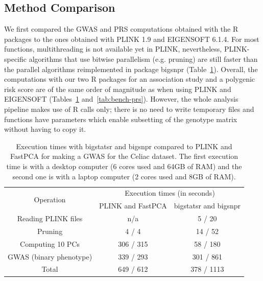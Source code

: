 \documentclass{bioinfo}
\begin{document}
\subsection{Method Comparison}

We first compared the GWAS and PRS computations obtained with the R packages to the ones obtained with PLINK 1.9 and EIGENSOFT 6.1.4.
For most functions, multithreading is not available yet in PLINK, nevertheless, PLINK-specific algorithms that use bitwise parallelism (e.g. pruning) are still faster than the parallel algorithms reimplemented in package bigsnpr (Table~\ref{tab:bench-gwas}). Overall, the computations with our two R packages for an association study and a polygenic risk score are of the same order of magnitude as when using PLINK and EIGENSOFT (Tables~\ref{tab:bench-gwas} and~\ref{tab:bench-prs}). However, the whole analysis pipeline makes use of R calls only; there is no need to write temporary files and functions have parameters which enable subsetting of the genotype matrix without having to copy it. 

\begin{table}[!tpb]
\begin{center}
\begin{adjustbox}{max width=235pt}
\begin{tabular}{|c|c|c|}
\hline
\multirow{2}{*}{Operation} &   \multicolumn{2}{c|}{Execution times (in seconds)} \\
 \cline{2-3}
 & PLINK and FastPCA & bigstatsr and bigsnpr \\
\hline
Reading PLINK files & n/a & 5 / 20 \\
Pruning & 4 / 4 & 14 / 52 \\
Computing 10 PCs & 306 / 315 & 58 / 180 \\
GWAS (binary phenotype) & 339 / 293 & 301 / 861 \\
\hline
Total & 649 / 612 & 378 / 1113 \\
\hline
\end{tabular} 
\end{adjustbox}
\end{center}
\caption{Execution times with bigstatsr and bigsnpr compared to PLINK and FastPCA for making a GWAS for the Celiac dataset. The first execution time is with a desktop computer (6 cores used and 64GB of RAM) and the second one is with a laptop computer (2 cores used and 8GB of RAM).} 
\label{tab:bench-gwas}
\end{table}
\end{document}
